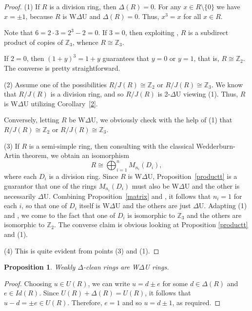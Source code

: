 \documentclass[12pt]{amsart}
\newtheorem{proposition}[theorem]{Proposition}
\theoremstyle{definition}
\begin{document}
\begin{proof}
(1) If \( R \) is a division ring, then \( \Delta(R) = 0 \). For any \( x \in R \setminus \{0\} \) we have \( x = \pm1 \), because \( R \) is W$\Delta$U and \( \Delta(R) = 0 \). Thus, \( x^3 = x \) for all \( x \in R \).
	
Note that \( 6 = 2 \cdot 3 = 2^3 - 2 = 0 \). If \( 3 = 0 \), then exploiting \cite[Ex.\ 12.11]{lam}, \( R \) is a subdirect product of copies of \( \mathbb{Z}_3 \), whence \( R \cong \mathbb{Z}_3 \).
	
If \( 2 = 0 \), then \( (1 + y)^3 = 1 + y \) guarantees that \( y = 0 \) or \( y = 1 \), that is, \( R \cong \mathbb{Z}_2 \). The converse is pretty straightforward.
	
(2) Assume one of the possibilities \( R/J(R) \cong \mathbb{Z}_2 \) or \(R/J(R) \cong  \mathbb{Z}_3 \). We know that \(R/J(R)\) is a division ring, and so \(R/J(R)\) is 2-$\Delta$U viewing (1). Thus, \(R\) is W$\Delta$U utilizing Corollary~\ref{2}.
	
Conversely, letting \(R\) be W$\Delta$U, we obviously check with the help of (1) that \(R/J(R) \cong \mathbb{Z}_2\) or \(R/J(R) \cong \mathbb{Z}_3\).
	
(3) If $R$ is a semi-simple ring, then consulting with the classical Wedderburn-Artin theorem, we obtain an isomorphism $$R \cong \bigoplus_{i=1}^n M_{n_i}(D_i),$$ where each $D_i$ is a division ring. Since $R$ is W$\Delta$U, Proposition~\ref{productt} is a guarantor that one of the rings $M_{n_i}(D_i)$ must also be W$\Delta$U and the other is necessarily $\Delta$U. Combining Proposition~\ref{matrix} and \cite[Theorem 2.5]{7}, it follows that $n_i=1$ for each $i$, so that one of $D_i$ itself is W$\Delta$U and the others are just $\Delta$U. Adapting (1) and \cite[Proposition 2.4(2)]{7}, we come to the fact that one of $D_i$ is isomorphic to $\mathbb{Z}_3$ and the others are isomorphic to $\mathbb{Z}_2$. The converse claim is obvious looking at Proposition \ref{productt} and (1).
	
(4) This is quite evident from points (3) and (1).
\end{proof}

\begin{proposition}\label{7}
Weakly $\Delta$-clean rings are W$\Delta$U rings.
\end{proposition}

\begin{proof}
Choosing \( u \in U(R) \), we can write \( u = d \pm e \) for some \( d \in \Delta(R) \) and \( e \in Id(R) \). Since \( U(R) + \Delta(R) = U(R) \), it follows that \( u - d = \pm e \in U(R) \). Therefore, \( e = 1 \) and so \( u = d \pm 1 \), as required.	
\end{proof}
\end{document}

